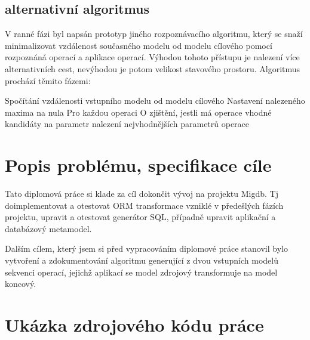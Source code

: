 \documentclass[11pt,twoside,a4paper]{book}
\begin{document}
\section{alternativní algoritmus}

V ranné fázi byl napsán prototyp jiného rozpoznávacího algoritmu, který se snaží 
minimalizovat vzdálenost současného modelu od modelu cílového pomocí rozpoznáná 
operací a aplikace operací. Výhodou tohoto přístupu je nalezení více alternativních 
cest, nevýhodou je potom velikost stavového prostoru. Algoritmus prochází těmito fázemi:

Spočítání vzdálenosti vstupního modelu od modelu cílového
Nastavení nalezeného maxima na nula
Pro každou operaci O
     zjištění, jestli má operace vhodné kandidáty na parametr
     nalezení nejvhodnějších parametrů operace



\chapter{Popis problému, specifikace cíle}
Tato diplomová práce si klade za cíl dokončit vývoj na projektu Migdb. Tj
doimplementovat a otestovat ORM transformace vzniklé v předešlých fázích
projektu, upravit a otestovat generátor SQL, případně upravit aplikační a
databázový metamodel.

Dalším cílem, který jsem si před vypracováním diplomové práce stanovil bylo
vytvoření a zdokumentování algoritmu generující z dvou vstupních modelů
sekvenci operací, jejichž aplikací se model zdrojový transformuje na model
koncový.


\chapter{Ukázka zdrojového kódu práce}


\end{document}
